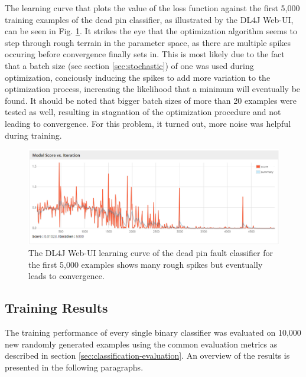 The learning curve that plots the value of the loss function against
the first 5,000 training examples of the dead pin classifier, as
illustrated by the DL4J Web-UI, can be seen in
Fig. \ref{fig:learning-curve}. It strikes the eye that the
optimization algorithm seems to step through
rough terrain in the parameter space, as there are multiple spikes
occuring before convergence finally sets in. This is most likely due
to the fact that a batch size (see section \ref{sec:stochastic}) of
one was used during optimization, conciously inducing the spikes to
add more variation to the optimization process, increasing
the likelihood that a minimum will eventually be found. It should be
noted that bigger batch sizes of more than 20 examples were tested as
well, resulting in stagnation of the optimization procedure and not
leading to convergence. For this problem, it turned out, more noise
was helpful during training.

\begin{figure}[h]
  \centering
  \includegraphics[width=\textwidth]{../figures/learning_curve}
  \caption{The DL4J Web-UI learning curve of the dead pin fault
    classifier for the first 5,000 examples shows many rough spikes
    but eventually leads to convergence.}
  \label{fig:learning-curve}
\end{figure}

\clearpage

\subsection{Training Results}

The training performance of every single binary classifier was
evaluated on 10,000 new randomly generated
examples using the common evaluation metrics as described in section
\ref{sec:classification-evaluation}. An overview of the results is
presented in the following paragraphs.

